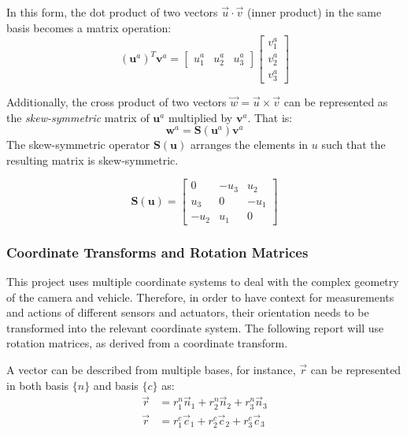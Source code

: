\documentclass{UoNMCHA}
\numberwithin{equation}{section}
\begin{document}
In this form, the dot product of two vectors $\vec{u} \cdot \vec{v}$ (inner product) in the same basis becomes a matrix operation:
\begin{equation}
	(\mathbf{u}^{a})^{T}\mathbf{v}^{a} = 
	\begin{bmatrix}
		u^{a}_1 & u^{a}_2 & u^{a}_3
	\end{bmatrix}
	\begin{bmatrix}
		v^{a}_1\\
		v^{a}_2\\
		v^{a}_3
	\end{bmatrix}
\end{equation}

Additionally, the cross product of two vectors $\vec{w} = \vec{u}\times\vec{v}$ can be represented as the \textit{skew-symmetric} matrix of $\mathbf{u}^{a}$ multiplied by $\mathbf{v}^{a}$. That is:
\begin{equation}
	\mathbf{w}^{a} = \mathbf{S}(\mathbf{u}^a)\mathbf{v}^a
\end{equation}
The skew-symmetric operator $\mathbf{S(u)}$ arranges the elements in $u$ such that the resulting matrix is skew-symmetric.

\begin{equation}\label{eq:SkewSymmetric}
	\mathbf{S}(\mathbf{u}) = 
	\begin{bmatrix}
		0 & -u_{3} & u_{2}\\
		u_{3} & 0 & -u_{1}\\
		-u_{2} & u_{1} & 0
	\end{bmatrix}
\end{equation}

\subsubsection{Coordinate Transforms and Rotation Matrices}
This project uses multiple coordinate systems to deal with the complex geometry of the camera and vehicle. Therefore, in order to have context for measurements and actions of different sensors and actuators, their orientation needs to be transformed into the relevant coordinate system. The following report will use rotation matrices, as derived from a coordinate transform.

A vector can be described from multiple bases, for instance, $\vec{r}$ can be represented in both basis $\{n\}$ and basis $\{c\}$ as:
\begin{equation}\label{eq:uInAandB}
	\begin{split}
		\vec{r} &= r^{n}_{1}\vec{n}_{1} + r^{n}_{2}\vec{n}_{2} + r^{n}_{3}\vec{n}_{3}\\
		\vec{r} &= r^{c}_{1}\vec{c}_{1} + r^{c}_{2}\vec{c}_{2} + r^{c}_{3}\vec{c}_{3}
	\end{split}
\end{equation}
\end{document}
